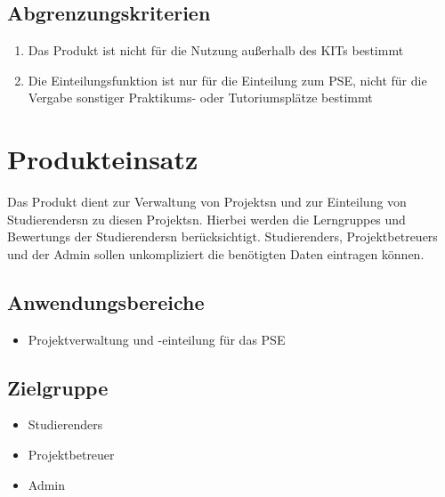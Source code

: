 \documentclass[parskip=full]{scrartcl}
\newcommand{\swtLabel}[1]{\textbf{/#1\arabic*0/}}
\begin{document}
\subsection{Abgrenzungskriterien}
\begin{enumerate}[label=\swtLabel{AG}]
 
  \item Das Produkt ist nicht für die Nutzung außerhalb des KITs bestimmt %

\item Die \gls{Einteilung}sfunktion ist nur für die \gls{Einteilung} zum \gls{PSE}, nicht
für die Vergabe sonstiger Praktikums- oder Tutoriumsplätze bestimmt
  
\end{enumerate}
\section{Produkteinsatz}

Das Produkt dient zur Verwaltung von \glspl{Projekt}n und zur \gls{Einteilung} von
\glspl{Studierender}n zu diesen \glspl{Projekt}n.
Hierbei werden die \glspl{Lerngruppe} und \glspl{Bewertung} der \glspl{Studierender}n berücksichtigt.
\glspl{Studierender}, \glspl{Projektbetreuer} und der \gls{Admin} sollen unkompliziert die benötigten Daten eintragen können.



\subsection{Anwendungsbereiche}

\begin{itemize} 
  \item Projektverwaltung und -einteilung für das \gls{PSE}
\end{itemize}

\subsection{Zielgruppe}
\begin{itemize} 
  \item \glspl{Studierender}
  \item \gls{Projektbetreuer}
  \item \gls{Admin}
\end{itemize}
\end{document}
